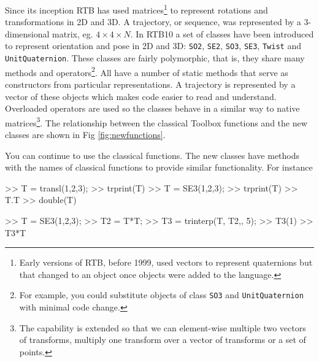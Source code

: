\documentclass[a4paper,twoside]{report}
\begin{document}
Since its inception RTB has used matrices\footnote{Early versions of RTB, before 1999, used vectors to represent quaternions but that changed to an object once objects were added to the language.} to represent rotations and transformations in 2D and 3D.  A trajectory, or sequence, was represented by a 3-dimensional matrix, eg. $4\times 4 \times N$.  In RTB10 a set of classes have been introduced to represent orientation and pose in 2D and 3D: \texttt{SO2}, \texttt{SE2}, \texttt{SO3}, \texttt{SE3}, \texttt{Twist} and \texttt{UnitQuaternion}.  These classes are fairly polymorphic, that is, they share many methods and operators\footnote{For example, you could substitute objects of class \texttt{SO3} and \texttt{UnitQuaternion} with minimal code change.}.  All have a number of static methods that serve as constructors from particular representations.  A trajectory is represented by a vector of these objects which makes code easier to read and
understand.  Overloaded operators are used so the classes behave in a similar way to native matrices\footnote{The capability is extended so that we can element-wise multiple two vectors of transforms, multiply one transform over a vector of transforms or a set of points.}.
The relationship between the classical Toolbox functions and the new classes are shown in Fig \ref{fig:newfunctions}.

You can continue to use the classical functions.  The new classes have methods with the names of classical functions to provide similar functionality.  For instance
\begin{Code}
>> T = transl(1,2,3);  %
>> trprint(T)  %
>> T = SE3(1,2,3);  %
>> trprint(T)  %
>> T.T   %
>> double(T) %
\end{Code}

\begin{Code}
>> T = SE3(1,2,3);  %
>> T2 = T*T;  %
>> T3 = trinterp(T, T2,, 5); %
>> T3(1)  %
>> T3*T  %
\end{Code}
\end{document}

